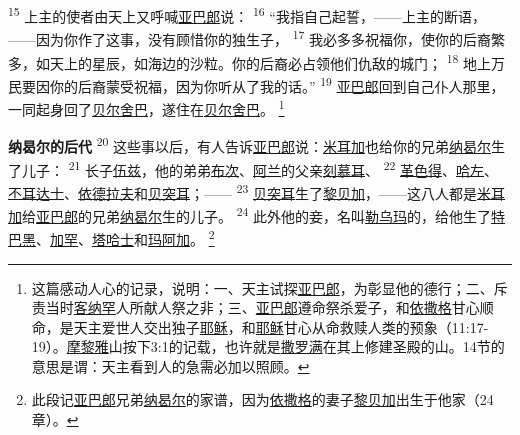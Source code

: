 \textsuperscript{15}
上主的使者由天上又呼喊\uline{亚巴郎}说：
\textsuperscript{16}
“我指自己起誓，——上主的断语，——因为你作了这事，没有顾惜你的独生子，
\textsuperscript{17}
我必多多祝福你，使你的后裔繁多，如天上的星辰，如海边的沙粒。你的后裔必占领他们仇敌的城门；
\textsuperscript{18}
地上万民要因你的后裔蒙受祝福，因为你听从了我的话。”
\textsuperscript{19}
\uline{亚巴郎}回到自己仆人那里，一同起身回了\uline{贝尔}\uline{舍巴}，遂住在\uline{贝尔}\uline{舍巴}。
\footnote{这篇感动人心的记录，说明：一、天主试探\uline{亚巴郎}，为彰显他的德行；二、斥责当时\uline{客纳罕}人所献人祭之非；三、\uline{亚巴郎}遵命祭杀爱子，和\uline{依撒格}甘心顺命，是天主爱世人交出独子\uline{耶稣}，和\uline{耶稣}甘心从命救赎人类的预象（11:17-19）。\uline{摩黎雅}山按下3:1的记载，也许就是\uline{撒罗满}在其上修建圣殿的山。14节的意思是谓：天主看到人的急需必加以照顾。}

\textbf{纳曷尔的后代\quad}
\textsuperscript{20}
这些事以后，有人告诉\uline{亚巴郎}说：\uline{米耳加}也给你的兄弟\uline{纳曷尔}生了儿子：
\textsuperscript{21}
长子\uline{伍兹}，他的弟弟\uline{布次}、\uline{阿兰}的父亲\uline{刻慕耳}、
\textsuperscript{22}
\uline{革色得}、\uline{哈左}、\uline{丕耳达士}、\uline{依德拉夫}和\uline{贝突耳}；——
\textsuperscript{23}
\uline{贝突耳}生了\uline{黎贝加}，——这八人都是\uline{米耳加}给\uline{亚巴郎}的兄弟\uline{纳曷尔}生的儿子。
\textsuperscript{24}
此外他的妾，名叫\uline{勒乌玛}的，给他生了\uline{特巴黑}、\uline{加罕}、\uline{塔哈士}和\uline{玛阿加}。
\footnote{此段记\uline{亚巴郎}兄弟\uline{纳曷尔}的家谱，因为\uline{依撒格}的妻子\uline{黎贝加}出生于他家（24章）。}

